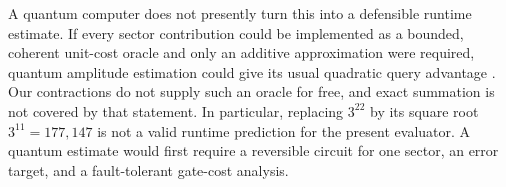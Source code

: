 A quantum computer does not presently turn this into a defensible runtime
estimate.  If every sector contribution could be implemented as a bounded,
coherent unit-cost oracle and only an additive approximation were required,
quantum amplitude estimation could give its usual quadratic query advantage
\cite{BrassardEtAl2002}.  Our contractions do not supply such an oracle for
free, and exact summation is not covered by that statement.  In particular,
replacing $3^{22}$ by its square root $3^{11}=177{,}147$ is not a valid
runtime prediction for the present evaluator.  A quantum estimate would
first require a reversible circuit for one sector, an error target, and a
fault-tolerant gate-cost analysis.
